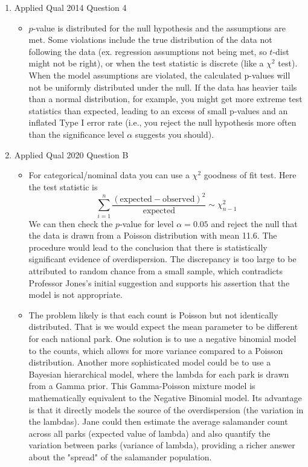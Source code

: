 \documentclass{article}
\begin{document}
\begin{itemize}
\begin{enumerate}[label=(\alph*)]
    \item Applied Qual 2014 Question 4
      \begin{itemize}
        \item $p$-value is distributed for the null hypothesis and the assumptions are met. Some violations include the true distribution of the data not following the data (ex. regression assumptions not being met, so $t$-dist might not be right), or when the test statistic is discrete (like a $\chi^2$ test). When the model assumptions are violated, the calculated p-values will not be uniformly distributed under the null. If the data has heavier tails than a normal distribution, for example, you might get more extreme test statistics than expected, leading to an excess of small p-values and an inflated Type I error rate (i.e., you reject the null hypothesis more often than the significance level $\alpha$ suggests you should).
      \end{itemize}
    \item Applied Qual 2020 Question B
      \begin{itemize}
        \item For categorical/nominal data you can use a $\chi^2$ goodness of fit test. Here the test statistic is
          \[ \sum_{i=1}^{n} \frac{(\text{expected} - \text{observed})^2}{\text{expected}} \sim \chi^2_{n-1} \]
          We can then check the $p$-value for level $\alpha=0.05$ and reject the null that the data is drawn from a Poisson distribution with mean 11.6. The procedure would lead to the conclusion that there is statistically significant evidence of overdispersion. The discrepancy is too large to be attributed to random chance from a small sample, which contradicts Professor Jones's initial suggestion and supports his assertion that the model is not appropriate.
        \item The problem likely is that each count is Poisson but not identically distributed. That is we would expect the mean parameter to be different for each national park.
          One solution is to use a negative binomial model to the counts, which allows for more variance compared to a Poisson distribution. Another more sophisticated model could be to use a Bayesian hierarchical model,
          where the lambda for each park is drawn from a Gamma prior. This Gamma-Poisson mixture model is mathematically equivalent to the Negative Binomial model. Its advantage is that it directly models the source of the overdispersion (the variation in the lambdas). Jane could then estimate the average salamander count across all parks (expected value of lambda) and also quantify the variation between parks (variance of lambda), providing a richer answer about the "spread" of the salamander population.

\end{itemize}
\end{enumerate}
\end{itemize}
\end{document}
